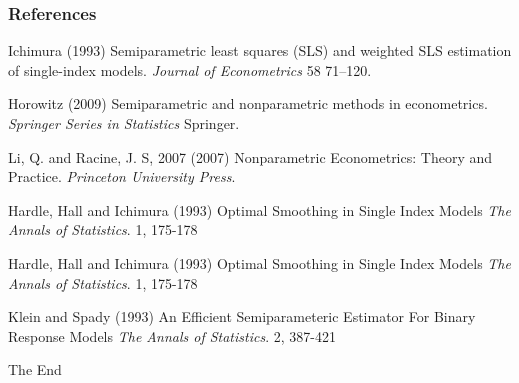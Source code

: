 \documentclass{beamer}
\begin{document}
\begin{frame}
\frametitle{References}
\footnotesize{
\begin{thebibliography}{99} %
 Ichimura (1993)
\newblock Semiparametric least squares (SLS) and weighted SLS estimation of single-index models.
\newblock \emph{Journal of Econometrics} 58 71–120.
\end{thebibliography}
}
\footnotesize{
\begin{thebibliography}{99} %
 Horowitz (2009)
\newblock Semiparametric and nonparametric methods in econometrics.
\newblock \emph{Springer Series in Statistics} Springer.
\end{thebibliography}
}

\footnotesize{
\begin{thebibliography}{99} %
 Li, Q. and Racine, J. S, 2007 (2007)
\newblock Nonparametric Econometrics: Theory and Practice.
\newblock \emph{Princeton University Press}.
\end{thebibliography}
}

\footnotesize{
\begin{thebibliography}{99} %
 Hardle, Hall and Ichimura (1993)
\newblock Optimal Smoothing in Single Index Models
\newblock \emph{The Annals of Statistics}. 1, 175-178
\end{thebibliography}
}

\footnotesize{
\begin{thebibliography}{99} %
 Hardle, Hall and Ichimura (1993)
\newblock Optimal Smoothing in Single Index Models
\newblock \emph{The Annals of Statistics}. 1, 175-178
\end{thebibliography}
}

\end{frame}


\begin{frame}


\footnotesize{
\begin{thebibliography}{99} %
 Klein and Spady (1993)
\newblock An Efficient Semiparameteric Estimator For Binary Response Models
\newblock \emph{The Annals of Statistics}. 2, 387-421
\end{thebibliography}
}
\end{frame}


\begin{frame}
\Huge{\centerline{The End}}
\end{frame}

\end{document}
